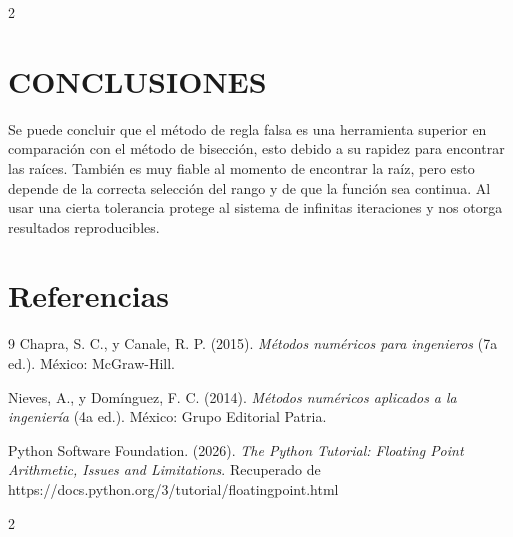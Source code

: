 \documentclass{rmf-d}
\begin{document}
\begin{multicols}{2}
\section{CONCLUSIONES}
\label{sec:5}
Se puede concluir que el método de regla falsa es una herramienta superior en comparación con el método de bisección, esto debido a su rapidez para encontrar las raíces. También es muy fiable al momento de encontrar la raíz, pero esto depende de la correcta selección del rango y de que la función sea continua. Al usar una cierta tolerancia protege al sistema de infinitas iteraciones y nos otorga resultados reproducibles.

\section{Referencias}
\begin{thebibliography}{9}
Chapra, S. C., y Canale, R. P. (2015). \textit{Métodos numéricos para ingenieros} (7a ed.). México: McGraw-Hill.

Nieves, A., y Domínguez, F. C. (2014). \textit{Métodos numéricos aplicados a la ingeniería} (4a ed.). México: Grupo Editorial Patria.

Python Software Foundation. (2026). \textit{The Python Tutorial: Floating Point Arithmetic, Issues and Limitations}. Recuperado de https://docs.python.org/3/tutorial/floatingpoint.html
\end{thebibliography}



























\end{multicols}
\medline
\begin{multicols}{2}

    
\printbibliography


\end{multicols}
\end{document}
